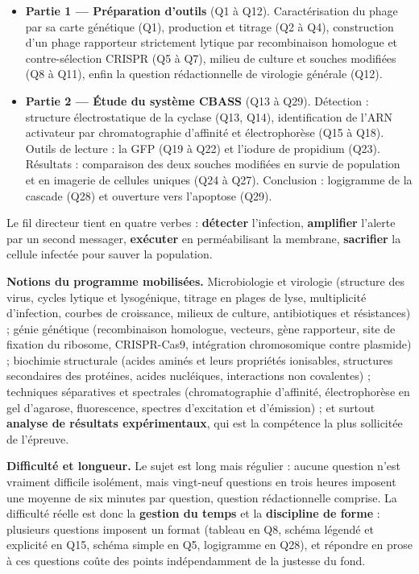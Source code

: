 \documentclass[11pt,a4paper]{article}
\providecommand{\tightlist}{\setlength{\itemsep}{0pt}\setlength{\parskip}{0pt}}
\begin{document}
\begin{itemize}
\tightlist
\item
  \textbf{Partie 1 --- Préparation d'outils} (Q1 à Q12). Caractérisation du phage par sa carte génétique (Q1), production et titrage (Q2 à Q4), construction d'un phage rapporteur strictement lytique par recombinaison homologue et contre-sélection CRISPR (Q5 à Q7), milieu de culture et souches modifiées (Q8 à Q11), enfin la question rédactionnelle de virologie générale (Q12).
\item
  \textbf{Partie 2 --- Étude du système CBASS} (Q13 à Q29). Détection : structure électrostatique de la cyclase (Q13, Q14), identification de l'ARN activateur par chromatographie d'affinité et électrophorèse (Q15 à Q18). Outils de lecture : la GFP (Q19 à Q22) et l'iodure de propidium (Q23). Résultats : comparaison des deux souches modifiées en survie de population et en imagerie de cellules uniques (Q24 à Q27). Conclusion : logigramme de la cascade (Q28) et ouverture vers l'apoptose (Q29).
\end{itemize}

Le fil directeur tient en quatre verbes : \textbf{détecter} l'infection, \textbf{amplifier} l'alerte par un second messager, \textbf{exécuter} en perméabilisant la membrane, \textbf{sacrifier} la cellule infectée pour sauver la population.

\textbf{Notions du programme mobilisées.} Microbiologie et virologie (structure des virus, cycles lytique et lysogénique, titrage en plages de lyse, multiplicité d'infection, courbes de croissance, milieux de culture, antibiotiques et résistances) ; génie génétique (recombinaison homologue, vecteurs, gène rapporteur, site de fixation du ribosome, CRISPR-Cas9, intégration chromosomique contre plasmide) ; biochimie structurale (acides aminés et leurs propriétés ionisables, structures secondaires des protéines, acides nucléiques, interactions non covalentes) ; techniques séparatives et spectrales (chromatographie d'affinité, électrophorèse en gel d'agarose, fluorescence, spectres d'excitation et d'émission) ; et surtout \textbf{analyse de résultats expérimentaux}, qui est la compétence la plus sollicitée de l'épreuve.

\textbf{Difficulté et longueur.} Le sujet est long mais régulier : aucune question n'est vraiment difficile isolément, mais vingt-neuf questions en trois heures imposent une moyenne de six minutes par question, question rédactionnelle comprise. La difficulté réelle est donc la \textbf{gestion du temps} et la \textbf{discipline de forme} : plusieurs questions imposent un format (tableau en Q8, schéma légendé et explicité en Q15, schéma simple en Q5, logigramme en Q28), et répondre en prose à ces questions coûte des points indépendamment de la justesse du fond.
\end{document}
